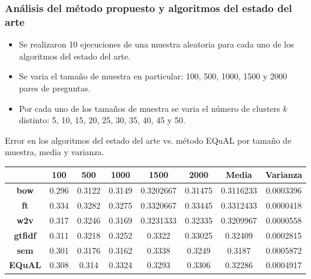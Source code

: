 \begin{frame}
	\frametitle{Análisis del método propuesto y algoritmos del estado del arte}
	\begin{itemize}
		\item Se realizaron 10 ejecuciones de una muestra aleatoria para cada uno de los algoritmos del estado del arte.
		\item Se varia el tamaño de muestra en particular: 100, 500, 1000, 1500 y 2000 pares de preguntas.
		\item Por cada uno de los tamaños de muestra se varia el número de clusters \(k\) distinto: 5, 10, 15, 20, 25, 30, 35, 40, 45 y 50.
	\end{itemize}

	\framebreak

	Error en los algoritmos del estado del arte vs. método EQuAL por tamaño de muestra, media y varianza.
	\begin{table}[h!]
		\scriptsize
		\begin{tabularx}{\textwidth}{cccccccc}
			\toprule
			& \textbf{100} & \textbf{500} & \textbf{1000} & \textbf{1500} & \textbf{2000} & \textbf{Media} & \textbf{Varianza} \\
			\midrule
			\textbf{bow}      & 0.296 & 0.3122 & 0.3149 & 0.3202667 & 0.31475 & \cellcolor[HTML]{D9EAD3}0.3116233 & 0.0003396                          \\
			\textbf{ft}       & 0.334 & 0.3282 & 0.3275 & 0.3320667 & 0.33445 & 0.3312433                         & \cellcolor[HTML]{D9EAD3}0.0000418 \\
			\textbf{w2v}      & 0.317 & 0.3246 & 0.3169 & 0.3231333 & 0.32335 & 0.3209967                         & 0.0000558                         \\
			\textbf{gtfidf}   & 0.311 & 0.3218 & 0.3252 & 0.3322       & 0.33025 & 0.32409                              & 0.0002815                              \\
			\textbf{sem}      & 0.301 & 0.3176 & 0.3162 & 0.3338       & 0.3249  & 0.3187                               & 0.0005872                                \\
			\textbf{EQuAL} & 0.308 & 0.314  & 0.3324 & 0.3293       & 0.3306  & 0.32286                              & 0.0004917                              \\
			\bottomrule
		\end{tabularx}
		\label{tab:error-arte-equal}
	\end{table}


\end{frame}
